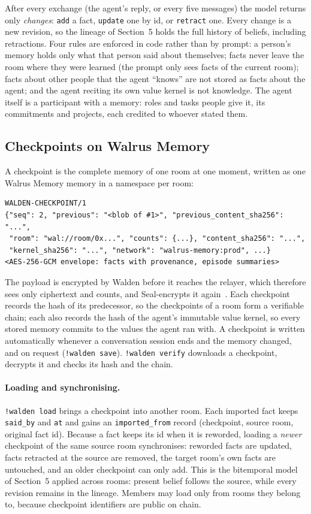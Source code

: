 \documentclass[11pt]{article}
\begin{document}
After every exchange (the agent's reply, or every five messages) the model returns only \emph{changes}: \texttt{add} a fact, \texttt{update} one by id, or \texttt{retract} one. Every change is a new revision, so the lineage of Section~5 holds the full history of beliefs, including retractions. Four rules are enforced in code rather than by prompt: a person's memory holds only what that person said about themselves; facts never leave the room where they were learned (the prompt only sees facts of the current room); facts about other people that the agent ``knows'' are not stored as facts about the agent; and the agent reciting its own value kernel is not knowledge. The agent itself is a participant with a memory: roles and tasks people give it, its commitments and projects, each credited to whoever stated them.

\subsection{Checkpoints on Walrus Memory}

A checkpoint is the complete memory of one room at one moment, written as one Walrus Memory memory in a namespace per room:

\begin{lstlisting}
WALDEN-CHECKPOINT/1
{"seq": 2, "previous": "<blob of #1>", "previous_content_sha256": "...",
 "room": "wal://room/0x...", "counts": {...}, "content_sha256": "...",
 "kernel_sha256": "...", "network": "walrus-memory:prod", ...}
<AES-256-GCM envelope: facts with provenance, episode summaries>
\end{lstlisting}

The payload is encrypted by Walden before it reaches the relayer, which therefore sees only ciphertext and counts, and Seal-encrypts it again~\cite{walrus-memory-docs}. Each checkpoint records the hash of its predecessor, so the checkpoints of a room form a verifiable chain; each also records the hash of the agent's immutable value kernel, so every stored memory commits to the values the agent ran with. A checkpoint is written automatically whenever a conversation session ends and the memory changed, and on request (\texttt{!walden save}). \texttt{!walden verify} downloads a checkpoint, decrypts it and checks its hash and the chain.

\paragraph{Loading and synchronising.} \texttt{!walden load} brings a checkpoint into another room. Each imported fact keeps \texttt{said\_by} and \texttt{at} and gains an \texttt{imported\_from} record (checkpoint, source room, original fact id). Because a fact keeps its id when it is reworded, loading a \emph{newer} checkpoint of the same source room synchronises: reworded facts are updated, facts retracted at the source are removed, the target room's own facts are untouched, and an older checkpoint can only add. This is the bitemporal model of Section~5 applied across rooms: present belief follows the source, while every revision remains in the lineage. Members may load only from rooms they belong to, because checkpoint identifiers are public on chain.
\end{document}
